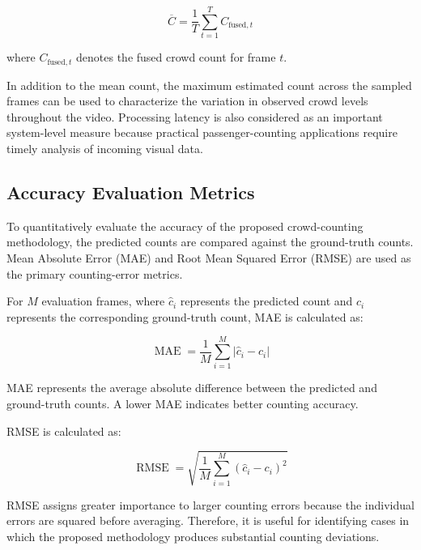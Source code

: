 \documentclass[12pt,a4paper]{report}
\begin{document}
\begin{equation}
\overline{C}
=
\frac{1}{T}
\sum_{t=1}^{T}
C_{\mathrm{fused},t}
\label{eq:mean-fused-count}
\end{equation}

where $C_{\mathrm{fused},t}$ denotes the fused crowd count for frame $t$.

In addition to the mean count, the maximum estimated count across the
sampled frames can be used to characterize the variation in observed crowd
levels throughout the video. Processing latency is also considered as an
important system-level measure because practical passenger-counting
applications require timely analysis of incoming visual data.


\subsection{Accuracy Evaluation Metrics}

To quantitatively evaluate the accuracy of the proposed crowd-counting
methodology, the predicted counts are compared against the ground-truth
counts. Mean Absolute Error (MAE) and Root Mean
Squared Error (RMSE) are used as the primary counting-error metrics.

For $M$ evaluation frames, where $\hat{c}_i$ represents the predicted count
and $c_i$ represents the corresponding ground-truth count, MAE is calculated
as:

\begin{equation}
\operatorname{MAE}
=
\frac{1}{M}
\sum_{i=1}^{M}
\left|
\hat{c}_i-c_i
\right|
\label{eq:mae}
\end{equation}

MAE represents the average absolute difference between the predicted and
ground-truth counts. A lower MAE indicates better counting accuracy.

RMSE is calculated as:

\begin{equation}
\operatorname{RMSE}
=
\sqrt{
\frac{1}{M}
\sum_{i=1}^{M}
\left(
\hat{c}_i-c_i
\right)^2
}
\label{eq:rmse}
\end{equation}

RMSE assigns greater importance to larger counting errors because the
individual errors are squared before averaging. Therefore, it is useful for
identifying cases in which the proposed methodology produces substantial
counting deviations.
\end{document}
